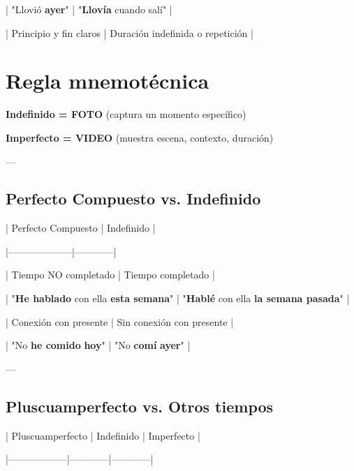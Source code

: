 \documentclass[a4paper,11pt]{article}
\begin{document}
| "Llovió \textbf{ayer}" | "\textbf{Llovía} cuando salí" |

| Principio y fin claros | Duración indefinida o repetición |

\vspace{0.2cm}

\section{Regla mnemotécnica}

\textbf{Indefinido = FOTO} (captura un momento específico)

\textbf{Imperfecto = VIDEO} (muestra escena, contexto, duración)

\vspace{0.2cm}

---

\vspace{0.2cm}

\subsection{Perfecto Compuesto vs. Indefinido}

\vspace{0.2cm}

| Perfecto Compuesto | Indefinido |

|--------------------|------------|

| Tiempo NO completado | Tiempo completado |

| "\textbf{He hablado} con ella \textbf{esta semana}" | "\textbf{Hablé} con ella \textbf{la semana pasada}" |

| Conexión con presente | Sin conexión con presente |

| "No \textbf{he comido} \textbf{hoy}" | "No \textbf{comí} \textbf{ayer}" |

\vspace{0.2cm}

---

\vspace{0.2cm}

\subsection{Pluscuamperfecto vs. Otros tiempos}

\vspace{0.2cm}

| Pluscuamperfecto | Indefinido | Imperfecto |

|------------------|------------|------------|
\end{document}
